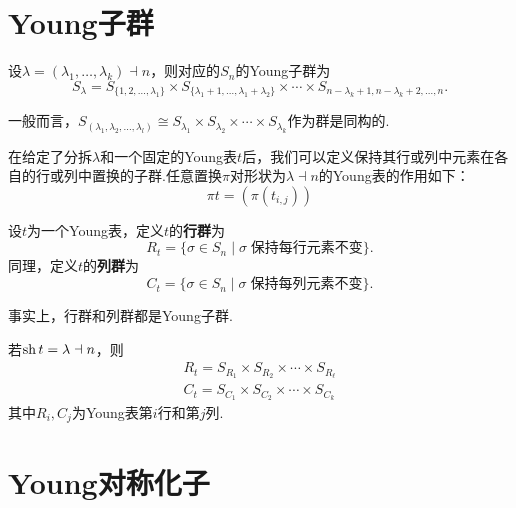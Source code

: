 \section{Young子群}

\begin{definition}[Young子群]
    设$\lambda=(\lambda_1,\ldots,\lambda_k)\dashv n$，则对应的$S_n$的Young子群为
    \begin{equation*}
        S_\lambda= S_{\{1,2,\ldots,\lambda_1\}} \times S_{\{\lambda_1+1,\ldots,\lambda_1+\lambda_2\}} \times \cdots \times S_{n-\lambda_k+1,n-\lambda_k+2,\ldots,n}.
    \end{equation*}
\end{definition}
一般而言，$S_{(\lambda_1,\lambda_2,\ldots,\lambda_l)}\cong S_{\lambda_1}\times S_{\lambda_2}\times\cdots\times S_{\lambda_k}$作为群是同构的.

在给定了分拆$\lambda$和一个固定的Young表$t$后，我们可以定义保持其行或列中元素在各自的行或列中置换的子群.任意置换$\pi$对形状为$\lambda\dashv n$的Young表的作用如下：
\begin{equation*}
    \pi t=(\pi(t_{i,j}))
\end{equation*}


\begin{definition}[行群与列群]
    设$t$为一个Young表，定义$t$的\textbf{行群}为
    \begin{equation*}
        R_t = \{ \sigma \in S_n \mid \sigma\;\text{保持每行元素不变}\}.
    \end{equation*}
    同理，定义$t$的\textbf{列群}为
    \begin{equation*}
        C_t = \{ \sigma \in S_n \mid \sigma\;\text{保持每列元素不变} \}.
    \end{equation*}
\end{definition}

事实上，行群和列群都是Young子群.
\begin{lemma}[]
    若$\operatorname{sh} t=\lambda\dashv n$，则
    \begin{gather*}
        R_t= S_{R_1}\times S_{R_2}\times \cdots\times S_{R_\ell}\\
        C_t= S_{C_1}\times S_{C_2}\times\cdots\times S_{C_k}
    \end{gather*}
    其中$R_i,C_j$为Young表第$i$行和第$j$列.
\end{lemma}


\section{Young对称化子}

